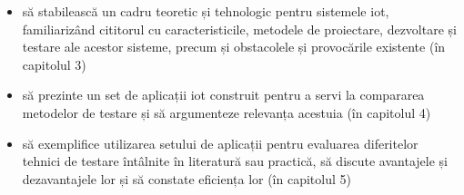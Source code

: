 \begin{itemize}
    \item să stabilească un cadru teoretic și tehnologic pentru sistemele \acrshort{iot}, familiarizând cititorul cu caracteristicile, metodele de proiectare, dezvoltare și testare ale acestor sisteme, precum și obstacolele și provocările existente (în capitolul 3)
    
    \item să prezinte un set de aplicații \acrshort{iot} construit pentru a servi la compararea metodelor de testare și să argumenteze relevanța acestuia (în capitolul 4)

    \item să exemplifice utilizarea setului de aplicații pentru evaluarea diferitelor tehnici de testare întâlnite în literatură sau practică, să discute avantajele și dezavantajele lor și să constate eficiența lor (în capitolul 5)
\end{itemize}